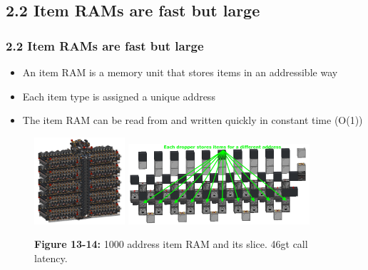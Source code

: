 \documentclass[aspectratio=169]{beamer}
\begin{document}
\subsection{2.2 Item RAMs are fast but large}


\begin{frame}
	\frametitle{2.2 Item RAMs are fast but large}

    \begin{itemize}
		\item An item RAM is a memory unit that stores items in an addressible way
        \item Each item type is assigned a unique address
        \item The item RAM can be read from and written quickly in constant time (O(1))
	\end{itemize}
    \begin{figure}
        \includegraphics[width=0.3\textwidth]{bigbigram.png}
        \includegraphics[width=0.6\textwidth]{bigbigramslice.png}
        \caption{\textbf{Figure 13-14:} 1000 address item RAM and its slice. 46gt call latency.}
	
    \end{figure}
\end{frame}
\end{document}
